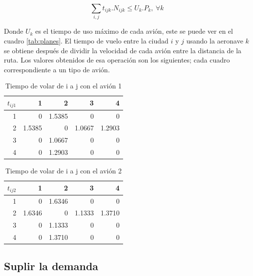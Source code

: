 \documentclass[12pt]{article}
\begin{document}
\begin{equation}
    \sum_{i,j} t_{ijk}.N_{ijk} \leq U_{k}.P_{k},\ \forall k
\end{equation}

Donde $U_k$ es el tiempo de uso máximo de cada avión, este se puede ver en el cuadro \ref{tab:planes}. El tiempo de vuelo entre la ciudad $i$ y $j$ usando la aeronave $k$ se obtiene después de dividir la velocidad de cada avión entre la distancia de la ruta. Los valores obtenidos de esa operación son los siguientes; cada cuadro correspondiente a un tipo de avión.

\newpage

\begin{table}[ht!]
    \centering
    \begin{tabular}{r|r|r|r|r}
        $t_{ij1}$%
               &   1  &   2  &   3  &   4\\
            \hline
            \hline
             1 &      0  & 1.5385  &      0  &      0\\
             2 & 1.5385  &      0  & 1.0667  & 1.2903\\
             3 &      0  & 1.0667  &      0  &      0\\
             4 &      0  & 1.2903  &      0  &      0\\
    \end{tabular}
    \caption{Tiempo de volar de i a j con el avión 1}
    \label{tab:tij1}
\end{table}

\begin{table}[ht!]
    \centering
    \begin{tabular}{r|r|r|r|r}
        $t_{ij2}$%
               &   1  &   2  &   3  &   4\\
            \hline
            \hline
             1 &      0  & 1.6346  &      0  &      0\\
             2 & 1.6346  &      0  & 1.1333  & 1.3710\\
             3 &      0  & 1.1333  &      0  &      0\\
             4 &      0  & 1.3710  &      0  &      0\\
    \end{tabular}
    \caption{Tiempo de volar de i a j con el avión 2}
    \label{tab:tij2}
\end{table}

\subsection{Suplir la demanda}
\end{document}
